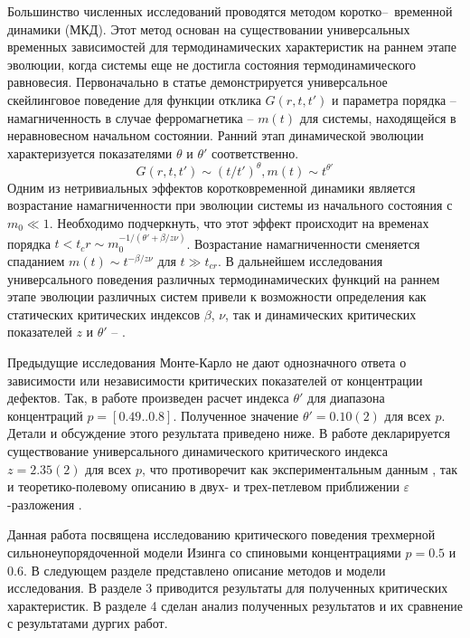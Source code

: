 \documentclass[12pt,a4paper]{article}
\begin{document}
Большинство численных исследований проводятся методом коротко\cdash--~{}временной динамики (МКД). Этот метод основан на существовании универсальных временных зависимостей для термодинамических характеристик на раннем этапе эволюции, когда системы еще не достигла состояния термодинамического равновесия. Первоначально в статье \cite{lit:Janssen} демонстрируется универсальное скейлинговое поведение для функции отклика $G(r,t,t')$ и параметра порядка -- намагниченность в случае ферромагнетика -- $m(t)$ для системы, находящейся в неравновесном начальном состоянии. Ранний этап динамической эволюции характеризуется показателями $\theta$ и $\theta'$ соответственно.
\begin{equation} \label{eq0}
 G(r,t,t') \sim (t/t')^{\theta},  m(t) \sim t^{\theta'}
\end{equation}
Одним из нетривиальных эффектов коротковременной динамики является возрастание намагниченности при эволюции системы из начального состояния с $m_0 \ll 1$. Необходимо подчеркнуть, что этот эффект происходит на временах порядка $t < t_cr \sim m_{0}^{-1/(\theta'+\beta/z\nu)}$. Возрастание намагниченности сменяется спаданием $m(t) \sim t^{-\beta/z\nu}$ для $t \gg t_{cr}$. В дальнейшем   исследования универсального поведения различных термодинамических функций на раннем этапе эволюции различных систем привели к возможности определения как статических критических индексов $\beta$, $\nu$, так и динамических критических показателей $z$ и $\theta'$ \cite{lit:Huse} -- \cite{lit:Luo}.

Предыдущие исследования Монте-Карло не дают однозначного ответа о зависимости или независимости критических показателей от концентрации дефектов. Так, в работе \cite{lit:Schehr} произведен расчет индекса $\theta'$ для диапазона концентраций $p = [0.49..0.8]$. Полученное значение $\theta' = 0.10(2)$  для всех $p$. Детали и обсуждение этого результата приведено ниже. В работе \cite{lit:Hasenbusch} декларируется существование универсального динамического критического индекса $z = 2.35(2)$ для всех $p$, что противоречит как экспериментальным данным \cite{lit:Rosov88}, так и теоретико-полевому описанию в двух- и трех-петлевом приближении $\varepsilon$-разложения \cite{lit:Prudnikov_FT}.

Данная работа посвящена исследованию критического поведения трехмерной сильнонеупорядоченной модели Изинга со спиновыми концентрациями $p = 0.5$ и $0.6$. В следующем разделе представлено описание методов и модели исследования. В разделе 3 приводится результаты для полученных критических характеристик. В разделе 4 сделан анализ полученных результатов и их сравнение с результатами дургих работ.
\end{document}

